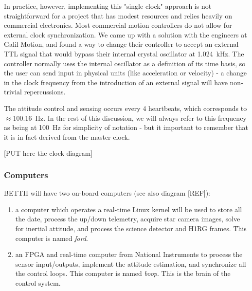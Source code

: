 In practice, however, implementing this "single clock" approach is not straightforward for a project that has modest resources and relies heavily on commercial electronics. Most commercial motion controllers do not allow for external clock synchronization. We came up with a solution with the engineers at Galil Motion, and found a way to change their controller to accept an external TTL signal that would bypass their internal crystal oscillator at \SI{1.024}{\kilo\hertz}. The controller normally uses the internal oscillator as a definition of its time basis, so the user can send input in physical units (like acceleration or velocity) - a change in the clock frequency from the introduction of an external signal will have non-trivial repercussions.

The attitude control and sensing occurs every 4 heartbeats, which corresponds to $\approx$\SI{100.16}{\hertz}. In the rest of this discussion, we will always refer to this frequency as being at \SI{100}{\hertz} for simplicity of notation - but it important to remember that it is in fact derived from the master clock.

[PUT here the clock diagram]

\subsubsection{Computers}

BETTII will have two on-board computers (see also diagram [REF]): 
\begin{enumerate}
\item a computer which operates a real-time Linux kernel will be used to store all the date, process the up/down telemetry, acquire star camera images, solve for inertial attitude, and process the science detector and H1RG frames. This computer is named \textit{ford}.
\item an FPGA and real-time computer from National Instruments to process the sensor input/outputs, implement the attitude estimation, and synchronize all the control loops. This computer is named \textit{boop}. This is the brain of the control system. 
\end{enumerate}


